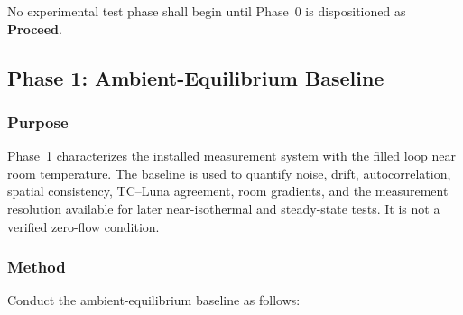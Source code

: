 \documentclass[11pt]{article}
\begin{document}
No experimental test phase shall begin until Phase~0 is dispositioned as \textbf{Proceed}.

\subsection{Phase 1: Ambient-Equilibrium Baseline}
\label{sec:baseline}

\subsubsection{Purpose}

Phase~1 characterizes the installed measurement system with the filled loop near room temperature. The baseline is used to quantify noise, drift, autocorrelation, spatial consistency, TC--Luna agreement, room gradients, and the measurement resolution available for later near-isothermal and steady-state tests. It is not a verified zero-flow condition.

\subsubsection{Method}

Conduct the ambient-equilibrium baseline as follows:
\end{document}
